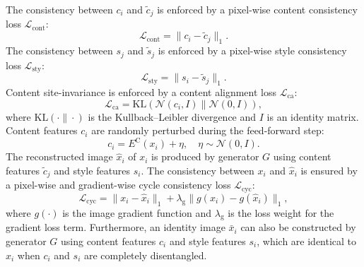 \documentclass{nature}
\begin{document}
\begin{methods}
The consistency between $c_i$ and $\tilde{c}_j$ is enforced by a pixel-wise content consistency loss $\mathcal{L}_\text{cont}$:
\begin{equation}
\mathcal{L}_\text{cont}=\|c_i-\tilde{c}_j\|_1.
\end{equation}
The consistency between $s_j$ and $\tilde{s}_j$ is enforced by a pixel-wise style consistency loss $\mathcal{L}_\text{sty}$:
\begin{equation}
	\mathcal{L}_\text{sty}=\|s_i-\tilde{s}_j\|_1.
\end{equation}
Content site-invariance is enforced by a content alignment loss $\mathcal{L}_\text{ca}$:
\begin{equation}
\mathcal{L}_\text{ca}=\text{KL}(\mathcal{N}(c_i,I)\|\mathcal{N}(0,I)),
\end{equation}
where $\text{KL}(\cdot\|\cdot)$ is the Kullback–Leibler divergence and $I$ is an identity matrix.
Content features $c_i$ are randomly perturbed during the feed-forward step:
\begin{equation}
c_i=E^{\text{C}}(x_i)+\eta,\quad \eta\sim\mathcal{N}(0,I).
\end{equation}
The reconstructed image $\hat{x}_i$ of $x_i$ is produced by generator $G$ using content features $\tilde{c}_j$ and style features $s_i$. The consistency between $x_i$ and $\hat{x}_i$ is ensured by a pixel-wise and gradient-wise cycle consistency loss $\mathcal{L}_\text{cyc}$:
\begin{equation}
\mathcal{L}_\text{cyc}=\|x_i-\hat{x}_i\|_1+\lambda_\text{g}\|g(x_i)-g(\hat{x}_i)\|_1,
\end{equation}
where $g(\cdot)$ is the image gradient function and $\lambda_\text{g}$ is the loss weight for the gradient loss term.
Furthermore, an identity image $\bar{x}_i$ can also be constructed by generator $G$ using content features $c_i$ and style features $s_i$, which are identical to $x_i$ when $c_i$ and $s_i$ are completely disentangled.

\end{methods}
\end{document}
